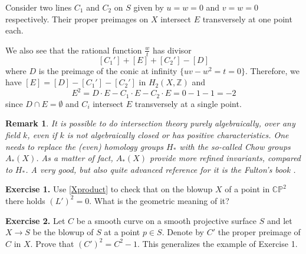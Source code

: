 \documentclass[11pt]{article}
\numberwithin{equation}{section}
\numberwithin{footnote}{section}
\newtheorem{rem}[thm]{Remark}
\renewcommand{\P}{{\mathbb P}}
\newcommand{\Z}{{\mathbb Z}}
\newcommand{\C}{{\mathbb C}}
\begin{document}
\smallskip
Consider two lines $C_1$ and $C_2$ on $S$ given by $u=w=0$ and $v=w=0$ respectively. Their proper preimages on 
$X$ intersect $E$ transversely at one point each. 


\noindent
We also see that the rational function $\frac wt$ has divisor 
$$
[C_1' ]+ [E] + [C_2'] - [D]
$$
where $D$ is the preimage of the conic at infinity $\{uv-w^2=t=0\}$. Therefore, we 
have $[E]=[D] - [C_1']-[C_2']$ in $H_2(X,\Z)$
and
$$
E^2 = D\cdot E - C_1 \cdot E - C_2 \cdot E = 0 - 1 - 1 = -2
$$
since $D\cap E = \emptyset$ and $C_i$ intersect $E$ transversely at a single point. 


\smallskip
\begin{rem}
It is possible to do intersection theory purely algebraically, over any field $k$, even if $k$ is not algebraically closed or has positive characteristics. One needs to replace the (even) homology groups $H_*$ with the so-called Chow groups $A_*(X)$. As a matter of fact, $A_*(X)$ provide more refined invariants, compared to $H_*$. A very good, but also quite advanced reference for it is the Fulton's book \cite{Fulton}.
\end{rem}


{\bf Exercise 1.} Use \eqref{Xproduct} to check that on the blowup $X$ of a point in $\C\P^2$ there holds $(L')^2=0$. What is the geometric meaning of it?

{\bf Exercise 2.} Let $C$ be a smooth curve on a smooth projective surface $S$ and let $X\to S$ be the blowup of $S$ at a point $p\in S$. Denote by $C'$ the proper preimage of $C$ in $X$. Prove that $(C')^2=C^2-1$. This generalizes the example of Exercise 1.
\end{document}
